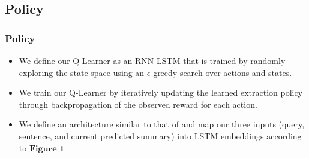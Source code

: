\documentclass[]{beamer}
\begin{document}

	\subsection{Policy}
	\begin{frame}
			\frametitle{Policy}
			\begin{itemize}
				\item<1-> We define our Q-Learner as an RNN-LSTM that is trained by randomly exploring the state-space using an $\epsilon$-greedy search over actions and states. 
				\item<1->We train our Q-Learner by iteratively updating the learned extraction policy through backpropagation of the observed reward for each action.
				\item<1-> We define an architecture similar to that of \cite{narasimhan2015language} and map our three inputs (query, sentence, and current predicted summary) into LSTM embeddings according to $\textbf{Figure 1}$
			\end{itemize}
	\end{frame}
\end{document}
